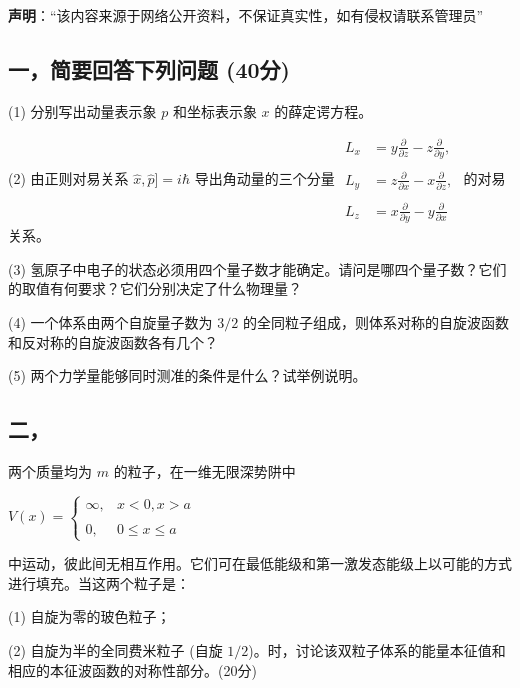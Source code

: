 
\textbf{声明}：“该内容来源于网络公开资料，不保证真实性，如有侵权请联系管理员”

\subsection{一，简要回答下列问题 (40分)}

(1) 分别写出动量表示象 $p$ 和坐标表示象 $x$ 的薛定谔方程。

(2) 由正则对易关系 $\hat{x}, \hat{p}] = i\hbar$ 导出角动量的三个分量
$\begin{aligned}    L_x &= y \frac{\partial}{\partial z} - z \frac{\partial}{\partial y}, \\\\    L_y &= z \frac{\partial}{\partial x} - x \frac{\partial}{\partial z}, \\\\    L_z &= x \frac{\partial}{\partial y} - y \frac{\partial}{\partial x}\end{aligned}$
的对易关系。

(3) 氢原子中电子的状态必须用四个量子数才能确定。请问是哪四个量子数？它们的取值有何要求？它们分别决定了什么物理量？

(4) 一个体系由两个自旋量子数为 $3/2$ 的全同粒子组成，则体系对称的自旋波函数和反对称的自旋波函数各有几个？

(5) 两个力学量能够同时测准的条件是什么？试举例说明。

\subsection{二，}两个质量均为 $m$ 的粒子，在一维无限深势阱中

$V(x) = \begin{cases} \infty, & x < 0, x > a \\\\0, & 0 \leq x \leq a \end{cases}$

中运动，彼此间无相互作用。它们可在最低能级和第一激发态能级上以可能的方式进行填充。当这两个粒子是：

(1) 自旋为零的玻色粒子；

(2) 自旋为半的全同费米粒子 (自旋 $1/2$)。时，讨论该双粒子体系的能量本征值和相应的本征波函数的对称性部分。(20分)

